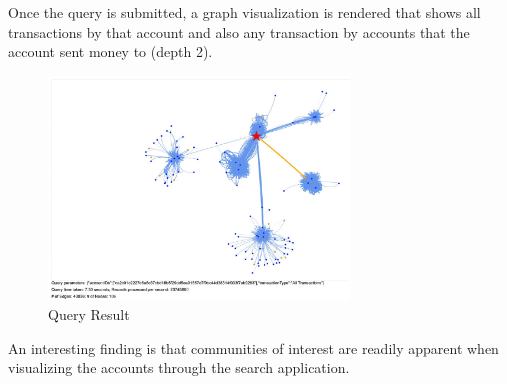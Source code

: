 \begin{itemize}
Once the query is submitted, a graph visualization is rendered that shows all transactions by that account and also any transaction by accounts that the account sent money to (depth 2).\cite{Neovis}

\begin{figure}[H]
\begin{center}
    \includegraphics[width=8cm]{imgs/queryresult.png}
    \caption{Query Result}
    \centering
\end{center}
\end{figure}

An interesting finding is that communities of interest are readily apparent when visualizing the accounts through the search application.


\end{itemize}

